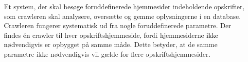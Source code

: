 {Et system, der skal besøge foruddefinerede hjemmesider indeholdende opskrifter, som crawleren skal analysere, oversætte og gemme oplysningerne i en database.}
{Crawleren fungerer systematisk ud fra nogle foruddefinerede parametre. Der findes én crawler til hver opskriftshjemmeside, fordi hjemmesiderne ikke nødvendigvis er opbygget på samme måde. Dette betyder, at de samme parametre ikke nødvendigvis vil gælde for flere opskriftshjemmesider.}
{}